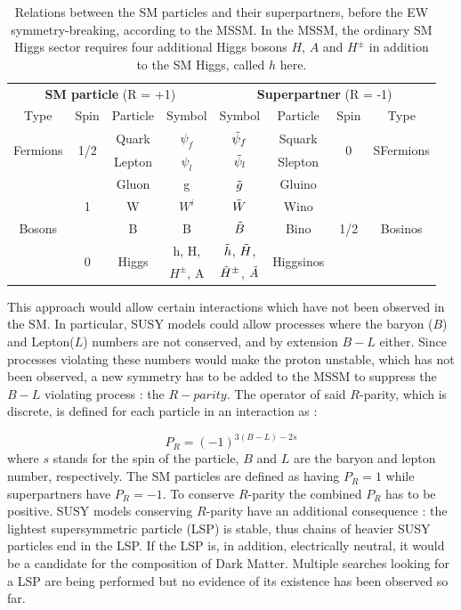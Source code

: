 \begin{table}[]
    \centering
    \caption{Relations between the SM particles and their superpartners, before the EW symmetry-breaking, according to the MSSM. In the MSSM, the ordinary SM Higgs sector requires four additional Higgs bosons $H$, $A$ and $H^{\pm}$ in addition to the SM Higgs, called $h$ here.}
    \begin{tabular}{c c c c | c c c c}
         \multicolumn{4}{c}{\textbf{SM particle} (R = +1)} & \multicolumn{4}{c}{\textbf{Superpartner} (R = -1)} \\
        Type & Spin & Particle & Symbol & Symbol & Particle & Spin & Type \\
        \hline
        \multirow{2}{*}{Fermions} & \multirow{2}{*}{1/2} & Quark & $\psi_f$ & $\Tilde{\psi}_f$ & Squark & \multirow{2}{*}{0} & \multirow{2}{*}{SFermions} \\
         & & Lepton & $\psi_l$ & $\Tilde{\psi}_l$ & Slepton & & \\
         \hline
         \multirow{5}{*}{Bosons} & \multirow{3}{*}{1} & Gluon & g & $\Tilde{g}$
   & Gluino & \multirow{5}{*}{1/2} & \multirow{5}{*}{Bosinos} \\
          & & W & $W^i$ & $\Tilde{W}$ & Wino & & \\
          & & B & B & $\Tilde{B}$ & Bino & & \\
          & \multirow{2}{*}{0} & \multirow{2}{*}{Higgs} & h, H, & $\Tilde{h}$, $\Tilde{H}$, & \multirow{2}{*}{Higgsinos} & & \\
          & & & $H^{\pm}$, A & $\Tilde{H}^{\pm}$, $\Tilde{A}$ & & & \\ 
          \hline
    \end{tabular}
    \label{tab:superpartners}
\end{table}

This approach would allow certain interactions which have not been observed in the SM. In particular, SUSY models could allow processes where the baryon ($B$) and Lepton($L$) numbers are not conserved, and by extension $B - L$ either. Since processes violating these numbers would make the proton unstable, which has not been observed, a new symmetry has to be added to the MSSM to suppress the $B-L$ violating process : the $R-parity$. The operator of said $R$-parity, which is discrete, is defined for each particle in an interaction as :

\begin{equation}
    P_R = (-1)^{3(B-L)-2s}
\end{equation}
where $s$ stands for the spin of the particle, $B$ and $L$ are the baryon and lepton number, respectively. The SM particles are defined as having $P_R = 1$ while superpartners have $P_R = -1$. To conserve $R$-parity the combined $P_R$ has to be positive. SUSY models conserving $R$-parity have an additional consequence : the lightest supersymmetric particle (LSP) is stable, thus chains of heavier SUSY particles end in the LSP. If the LSP is, in addition, electrically neutral, it would be a candidate for the composition of Dark Matter. Multiple searches looking for a LSP are being performed but no evidence of its existence has been observed so far.\newline

